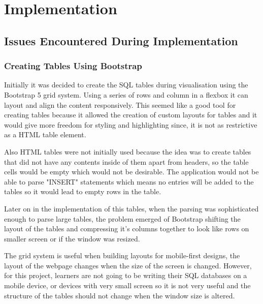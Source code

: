 \chapter{Implementation}

\section{Issues Encountered During Implementation}

\subsection{Creating Tables Using Bootstrap}

Initially it was decided to create the SQL tables during visualisation using the Bootstrap 5 grid system. Using a series of rows and column in a flexbox it can layout and align the content responsively. This seemed like a good tool for creating tables because it allowed the creation of custom layouts for tables and it would give more freedom for styling and highlighting since, it is not as restrictive as a HTML table element. 

Also HTML tables were not initially used because the idea was to create tables that did not have any contents inside of them apart from headers, so the table cells would be empty which would not be desirable. The application would not be able to parse "INSERT" statements which means no entries will be added to the tables so it would lead to empty rows in the table.

Later on in the implementation of this tables, when the parsing was sophisticated enough to parse large tables, the problem emerged of Bootstrap shifting the layout of the tables and compressing it's columns together to look like rows on smaller screen or if the window was resized. 

The grid system is useful when building layouts for mobile-first designs, the layout of the webpage changes when the size of the screen is changed. However, for this project, learners are not going to be writing their SQL databases on a mobile device, or devices with very small screen so it is not very useful and the structure of the tables should not change when the window size is altered. 

